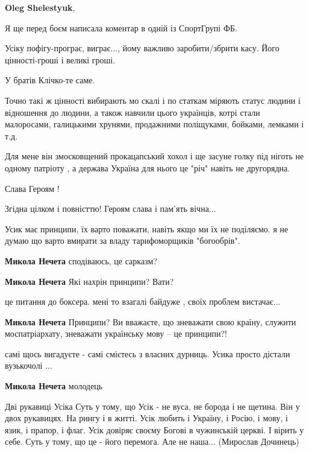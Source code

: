 \begin{itemize}
\begin{itemize}
\textbf{Oleg Shelestyuk}, 

Я ще перед боєм написала коментар в одній із СпортГрупі ФБ.

Усіку пофігу-програє, виграє..., йому важливо заробити/збрити касу. Його
цінності-гроші і великі гроші.

У братів Клічко-те саме.

Точно такі ж цінності вибирають мо скалі і по статкам міряють статус людини і
відношення до людини, а також навчили цього українців, котрі стали малоросами,
галицькими хрунями, продажними поліщуками, бойками, лемками і т.д.

\end{itemize} %


Для мене він змосковщений прокацапський хохол і ще засуне голку під ніготь не
одному патріоту , а держава Україна для нього це "річ" навіть не другорядна.

Слава Героям !

Згідна цілком і повністтю! Героям слава і пам'ять вічна...


Усик має принципи, їх варто поважати, навіть якщо ми їх не поділяємо. я не
думаю що варто вмирати за владу тарифоморщиків "богообрів".

\begin{itemize} %
\textbf{Микола Нечета} сподіваюсь, це сарказм?

\textbf{Микола Нечета} Які нахрін принципи? Вати?

це питання до боксера. мені то взагалі байдуже , своїх проблем вистачає...

\textbf{Микола Нечета} Принципи? Ви вважаєте, що зневажати свою країну, служити моспатріархату, зневажати українську мову – це принципи?!

самі щось вигадуєте - самі смієтесь з власних дурниць. Усика просто дістали вузькочолі ...

\textbf{Микола Нечета} молодець
\end{itemize} %


\obeycr
Дві рукавиці Усіка
Суть у тому, що Усік - не вуса, не борода і не щетина. Він у двох рукавицях. На рингу і в житті. Усік любить і Україну, і Росію, і мову, і язик, і прапор, і флаг. Усік довіряє своєму Богові в чужинській церкві. І вірить у себе.
Суть у тому, що це - його перемога. Але не наша...
(Мирослав Дочинець)
\restorecr


\end{itemize}
